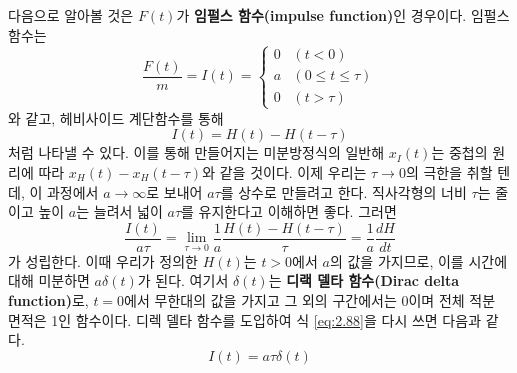 \documentclass[chapter, oneside, b5paper]{oblivoir}
\theoremstyle{plain}
\theoremstyle{definition}
\theoremstyle{remark}
\begin{document}
다음으로 알아볼 것은 $F(t)$가 \textbf{임펄스 함수(impulse function)}인 경우이다. 임펄스 함수는
\begin{equation}
    \frac{F(t)}{m} = I(t) = \begin{cases}
    0 & (t<0) \\
    a & (0 \le t \le \tau) \\
    0 & (t > \tau) \end{cases}
    \label{eq:2.86}
\end{equation}
와 같고, 헤비사이드 계단함수를 통해
\begin{equation}
    I(t) = H(t)-H(t-\tau) \label{eq:2.87}
\end{equation}
처럼 나타낼 수 있다. 이를 통해 만들어지는 미분방정식의 일반해 $x_I(t)$는 중첩의 원리에 따라 $x_H(t)-x_H(t-\tau)$와 같을 것이다. 이제 우리는 $\tau \to 0$의 극한을 취할 텐데, 이 과정에서 $a \to \infty$로 보내어 $a\tau$를 상수로 만들려고 한다. 직사각형의 너비 $\tau$는 줄이고 높이 $a$는 늘려서 넓이 $a\tau$를 유지한다고 이해하면 좋다. 그러면
\begin{equation}
    \frac{I(t)}{a\tau} = \lim_{\tau \to 0} \frac{1}{a}\frac{H(t)-H(t-\tau)}{\tau} = \frac{1}{a}\frac{dH}{dt} \label{eq:2.88}
\end{equation}가 성립한다. 이때 우리가 정의한 $H(t)$는 $t>0$에서 $a$의 값을 가지므로, 이를 시간에 대해 미분하면 $a\delta(t)$가 된다. 여기서 $\delta(t)$는 \textbf{디랙 델타 함수(Dirac delta function)}로, $t=0$에서 무한대의 값을 가지고 그 외의 구간에서는 0이며 전체 적분 면적은 1인 함수이다. 디렉 델타 함수를 도입하여 식 \ref{eq:2.88}을 다시 쓰면 다음과 같다.
\begin{equation}
    I(t) = a\tau \delta(t) \label{eq:2.89}
\end{equation}
\end{document}
